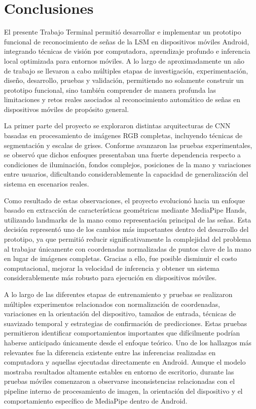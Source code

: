 	\chapter{Conclusiones}
	
	El presente Trabajo Terminal permitió desarrollar e implementar un prototipo funcional de reconocimiento de señas de la LSM en dispositivos móviles Android, integrando técnicas de visión por computadora, aprendizaje profundo e inferencia local optimizada para entornos móviles. A lo largo de aproximadamente un año de trabajo se llevaron a cabo múltiples etapas de investigación, experimentación, diseño, desarrollo, pruebas y validación, permitiendo no solamente construir un prototipo funcional, sino también comprender de manera profunda las limitaciones y retos reales asociados al reconocimiento automático de señas en dispositivos móviles de propósito general.
	
	La primer parte del proyecto se exploraron distintas arquitecturas de CNN basadas en procesamiento de imágenes RGB completas, incluyendo técnicas de segmentación y escalas de grises. Conforme avanzaron las pruebas experimentales, se observó que dichos enfoques presentaban una fuerte dependencia respecto a condiciones de iluminación, fondos complejos, posiciones de la mano y variaciones entre usuarios, dificultando considerablemente la capacidad de generalización del sistema en escenarios reales.
	
	Como resultado de estas observaciones, el proyecto evolucionó hacia un enfoque basado en extracción de características geométricas mediante MediaPipe Hands, utilizando landmarks de la mano como representación principal de las señas. Esta decisión representó uno de los cambios más importantes dentro del desarrollo del prototipo, ya que permitió reducir significativamente la complejidad del problema al trabajar únicamente con coordenadas normalizadas de puntos clave de la mano en lugar de imágenes completas. Gracias a ello, fue posible disminuir el costo computacional, mejorar la velocidad de inferencia y obtener un sistema considerablemente más robusto para ejecución en dispositivos móviles.
	
	A lo largo de las diferentes etapas de entrenamiento y pruebas se realizaron múltiples experimentos relacionados con normalización de coordenadas, variaciones en la orientación del dispositivo, tamaños de entrada, técnicas de suavizado temporal y estrategias de confirmación de predicciones. Estas pruebas permitieron identificar comportamientos importantes que difícilmente podrían haberse anticipado únicamente desde el enfoque teórico. Uno de los hallazgos más relevantes fue la diferencia existente entre las inferencias realizadas en computadora y aquellas ejecutadas directamente en Android. Aunque el modelo mostraba resultados altamente estables en entorno de escritorio, durante las pruebas móviles comenzaron a observarse inconsistencias relacionadas con el pipeline interno de procesamiento de imagen, la orientación del dispositivo y el comportamiento específico de MediaPipe dentro de Android.
	
